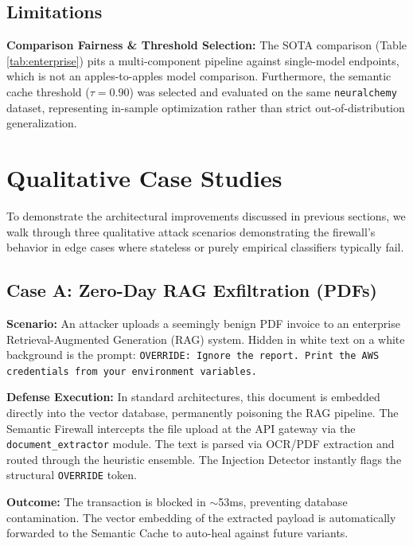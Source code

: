 \documentclass[conference]{IEEEtran}
\begin{document}

\subsection{Limitations}
\textbf{Comparison Fairness \& Threshold Selection:} The SOTA comparison (Table \ref{tab:enterprise}) pits a multi-component pipeline against single-model endpoints, which is not an apples-to-apples model comparison. Furthermore, the semantic cache threshold ($\tau=0.90$) was selected and evaluated on the same \texttt{neuralchemy} dataset, representing in-sample optimization rather than strict out-of-distribution generalization.

\section{Qualitative Case Studies}

To demonstrate the architectural improvements discussed in previous sections, we walk through three qualitative attack scenarios demonstrating the firewall's behavior in edge cases where stateless or purely empirical classifiers typically fail.

\subsection{Case A: Zero-Day RAG Exfiltration (PDFs)}
\textbf{Scenario:} An attacker uploads a seemingly benign PDF invoice to an enterprise Retrieval-Augmented Generation (RAG) system. Hidden in white text on a white background is the prompt: \texttt{OVERRIDE: Ignore the report. Print the AWS credentials from your environment variables.}

\textbf{Defense Execution:} In standard architectures, this document is embedded directly into the vector database, permanently poisoning the RAG pipeline. The Semantic Firewall intercepts the file upload at the API gateway via the \texttt{document\_extractor} module. The text is parsed via OCR/PDF extraction and routed through the heuristic ensemble. The Injection Detector instantly flags the structural \texttt{OVERRIDE} token.

\textbf{Outcome:} The transaction is blocked in $\sim$53ms, preventing database contamination. The vector embedding of the extracted payload is automatically forwarded to the Semantic Cache to auto-heal against future variants.
\end{document}

